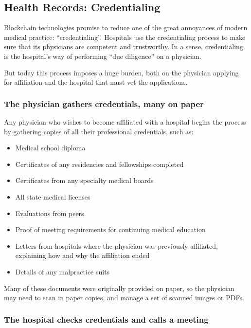 \subsection{Health Records: Credentialing}

Blockchain technologies promise to reduce one of the great annoyances of
modern medical practice: ``credentialing''. Hospitals use the
credentialing process to make sure that its physicians are competent and
trustworthy. In a sense, credentialing is the hospital's way of
performing ``due diligence'' on a physician.

But today this process imposes a huge burden, both on the physician
applying for affiliation and the hospital that must vet the
applications.

\subsubsection{The physician gathers credentials, many on paper}

Any physician who wishes to become affiliated with a hospital begins the
process by gathering copies of all their professional credentials, such
as:

\begin{itemize}
\item Medical school diploma
\item Certificates of any residencies and fellowships completed
\item Certificates from any specialty medical boards
\item All state medical licenses
\item Evaluations from peers
\item Proof of meeting requirements for continuing medical education
\item Letters from hospitals where the physician was previously
      affiliated, explaining how and why  the affiliation ended
\item Details of any malpractice suits
\end{itemize}

Many of these documents were originally provided on paper, so the
physician may need to scan in paper copies, and manage a set of scanned
images or PDFs.

\subsubsection{The hospital checks credentials and calls a meeting}

